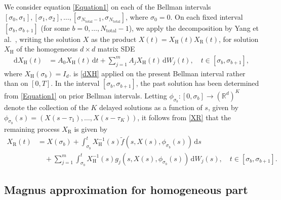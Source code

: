 \documentclass[onefignum]{siamart250211}
\begin{document}
We consider equation \cref{Equation1} on each of the Bellman intervals $[\sigma_0,\sigma_1],[\sigma_1,\sigma_2],\ldots,\allowbreak[\sigma_{{N_{\mathrm{total}}}-1},\sigma_{N_{\mathrm{total}}}]$, where $\sigma_0=0$. On each fixed interval $[\sigma_b,\sigma_{b+1}]$ (for some $b=0,\ldots,{N_{\mathrm{total}}}-1$), we apply the decomposition by Yang et al.\ \cite{BurrageBurrage2021}, writing the solution $X$ as the product $X(t)=X_\mathrm{H}(t)X_\mathrm{R}(t)$, for solution $X_\mathrm{H}$ of the homogeneous $d\times d$ matrix SDE
\begin{align}
\mathrm{d}X_\mathrm{H}(t)&=A_0X_\mathrm{H}(t)\,\mathrm{d}t+\sum_{j=1}^mA_jX_\mathrm{H}(t)\,\mathrm{d}W_j(t),\quad t\in[\sigma_b,\sigma_{b+1}],\label{dXHd}
\end{align}
where $X_\mathrm{H}(\sigma_b)=I_d$.  is \cref{dXH} applied on the present Bellman interval rather than on $[0,T]$. In the interval $[\sigma_b,\sigma_{b+1}]$, the past solution has been determined from \cref{Equation1} on prior Bellman intervals. Letting $\phi_{\sigma_b}:[0,\sigma_b]\to(\mathbb{R}^d)^K$ denote the collection of the $K$ delayed solutions as a function of $s$, given by $\phi_{\sigma_b}(s)=(X(s-\tau_1),\ldots,X(s-\tau_K))$, it follows from \cref{XR} that the remaining process $X_\mathrm{R}$ is given by
\begin{align}
X_\mathrm{R}(t)&=X(\sigma_b)+\int_{\sigma_b}^tX_\mathrm{H}^{-1}(s)\tilde{f}(s,X(s),\phi_{\sigma_b}(s))\,\mathrm{d}s\label{XRd}\\
&\quad+\sum_{j=1}^m\int_{\sigma_b}^tX_\mathrm{H}^{-1}(s)g_j(s,X(s),\phi_{\sigma_b}(s))\,\mathrm{d}W_j(s),\quad t\in[\sigma_b,\sigma_{b+1}].\nonumber
\end{align}





\subsection{Magnus approximation for homogeneous part}
\end{document}
